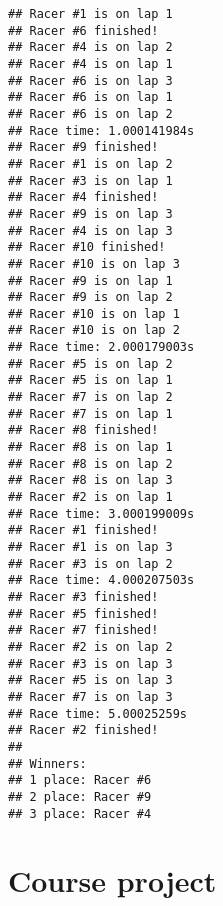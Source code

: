 \documentclass[]{book}
\begin{document}
\begin{verbatim}
## Racer #1 is on lap 1
## Racer #6 finished!
## Racer #4 is on lap 2
## Racer #4 is on lap 1
## Racer #6 is on lap 3
## Racer #6 is on lap 1
## Racer #6 is on lap 2
## Race time: 1.000141984s
## Racer #9 finished!
## Racer #1 is on lap 2
## Racer #3 is on lap 1
## Racer #4 finished!
## Racer #9 is on lap 3
## Racer #4 is on lap 3
## Racer #10 finished!
## Racer #10 is on lap 3
## Racer #9 is on lap 1
## Racer #9 is on lap 2
## Racer #10 is on lap 1
## Racer #10 is on lap 2
## Race time: 2.000179003s
## Racer #5 is on lap 2
## Racer #5 is on lap 1
## Racer #7 is on lap 2
## Racer #7 is on lap 1
## Racer #8 finished!
## Racer #8 is on lap 1
## Racer #8 is on lap 2
## Racer #8 is on lap 3
## Racer #2 is on lap 1
## Race time: 3.000199009s
## Racer #1 finished!
## Racer #1 is on lap 3
## Racer #3 is on lap 2
## Race time: 4.000207503s
## Racer #3 finished!
## Racer #5 finished!
## Racer #7 finished!
## Racer #2 is on lap 2
## Racer #3 is on lap 3
## Racer #5 is on lap 3
## Racer #7 is on lap 3
## Race time: 5.00025259s
## Racer #2 finished!
## 
## Winners:
## 1 place: Racer #6
## 2 place: Racer #9
## 3 place: Racer #4
\end{verbatim}

\hypertarget{course-project}{%
\chapter*{Course project}\label{course-project}}
\end{document}
